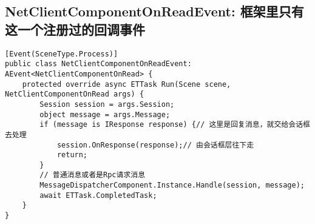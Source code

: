 \documentclass[9pt, b5paper]{article}
\begin{document}
\subsection{NetClientComponentOnReadEvent: 框架里只有这一个注册过的回调事件}
\label{sec-1-7}
\begin{verbatim}
[Event(SceneType.Process)]
public class NetClientComponentOnReadEvent: AEvent<NetClientComponentOnRead> {
    protected override async ETTask Run(Scene scene, NetClientComponentOnRead args) {
        Session session = args.Session;
        object message = args.Message;
        if (message is IResponse response) {// 这里是回复消息，就交给会话框去处理
            session.OnResponse(response);// 由会话框层往下走
            return;
        }
        // 普通消息或者是Rpc请求消息
        MessageDispatcherComponent.Instance.Handle(session, message);
        await ETTask.CompletedTask;
    }
}
\end{verbatim}
\end{document}
